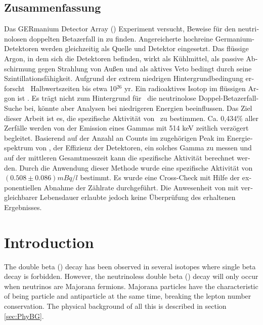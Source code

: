 \documentclass[encoding=utf8,british]{tumphthesis}
\begin{document}
\begin{otherlanguage}{ngerman}
\chapter*{Zusammenfassung}
Das GERmanium Detector Array (\gerda) Experiment versucht, Beweise für den neutrinolosen doppelten Betazerfall in  zu finden.
Angereicherte hochreine Germanium-Detektoren werden gleichzeitig als Quelle und Detektor eingesetzt.
Das flüssige Argon, in dem sich die Detektoren befinden, wirkt als Kühlmittel, als passive Abschirmung gegen Strahlung von Außen und als aktives Veto bedingt durch seine Szintillationsfähigkeit.
Aufgrund der extrem niedrigen Hintergrundbedingung erforscht \gerda\ Halbwertszeiten bis etwa 10$^{26}$ yr.
Ein radioaktives Isotop im flüssigen Argon ist .
Es trägt nicht zum Hintergrund für \gerdas\ die neutrinolose Doppel-Betazerfall-Suche bei, könnte aber Analysen bei niedrigeren Energien beeinflussen.
Das Ziel dieser Arbeit ist es, die spezifische Aktivität von \Kr\ zu bestimmen.
Ca. 0,434$\%$ aller \Kr\-Zerfälle werden von der Emission eines Gammas mit 514 keV zeitlich verzögert begleitet.
Basierend auf der Anzahl an Counts im zugehörigen Peak im Energiespektrum von \gerda, der Effizienz der Detektoren, ein solches Gamma zu messen und auf der mittleren Gesamtmesszeit kann die spezifische \Kr\-Aktivität berechnet werden.
Durch die Anwendung dieser Methode wurde eine spezifische Aktivität von $(0.508\pm0.086) \unit{mBq}/ \unit{l}$ bestimmt.
Es wurde eine Cross-Check mit Hilfe der exponentiellen Abnahme der Zählrate durchgeführt.
Die Anwesenheit von  mit vergleichbarer Lebensdauer erlaubte jedoch keine Überprüfung des erhaltenen Ergebnisses.

\end{otherlanguage}

\tableofcontents

\mainmatter

\chapter{Introduction}
\label{sec:intro}

The double beta (\twonu) decay has been observed in several isotopes where single beta decay is forbidden.
However, the neutrinoless double beta (\onbb) decay will only occur when neutrinos are Majorana fermions.
Majorana particles have the characteristic of being particle and antiparticle at the same time, breaking the lepton number conservation.
The physical background of all this is described in section \ref{sec:PhyBG}.
\\
\end{document}
